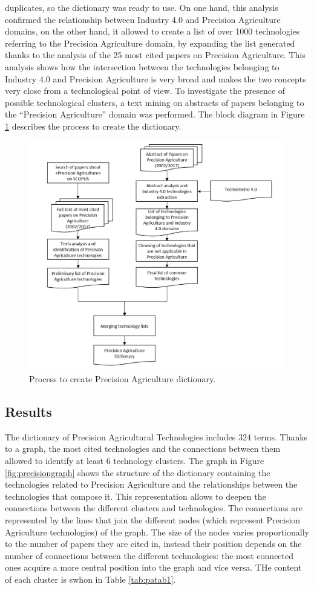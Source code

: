 \documentclass[]{book}
\begin{document}
duplicates, so the dictionary was ready to use. On one hand, this
analysis confirmed the relationship between Industry 4.0 and Precision
Agriculture domains, on the other hand, it allowed to create a list of
over 1000 technologies referring to the Precision Agriculture domain, by
expanding the list generated thanks to the analysis of the 25 most cited
papers on Precision Agriculture. This analysis shows how the
intersection between the technologies belonging to Industry 4.0 and
Precision Agriculture is very broad and makes the two concepts very
close from a technological point of view. To investigate the presence of
possible technological clusters, a text mining on abstracts of papers
belonging to the ``Precision Agriculture'' domain was performed. The
block diagram in Figure \ref{fig:precisionwf} describes the process to
create the dictionary.

\begin{figure}

{\centering \includegraphics[width=0.6\linewidth]{_bookdown_files/figures/precisionwf} 

}

\caption{Process to create Precision Agriculture dictionary.}\label{fig:precisionwf}
\end{figure}

\subsection{Results}\label{results-6}

The dictionary of Precision Agricultural Technologies includes 324
terms. Thanks to a graph, the most cited technologies and the
connections between them allowed to identify at least 6 technology
clusters. The graph in Figure \ref{fig:precisiongraph} shows the
structure of the dictionary containing the technologies related to
Precision Agriculture and the relationships between the technologies
that compose it. This representation allows to deepen the connections
between the different clusters and technologies. The connections are
represented by the lines that join the different nodes (which represent
Precision Agriculture technologies) of the graph. The size of the nodes
varies proportionally to the number of papers they are cited in, instead
their position depends on the number of connections between the
different technologies: the most connected ones acquire a more central
position into the graph and vice versa. THe content of each cluster is
swhon in Table \ref{tab:patab1}.
\end{document}
